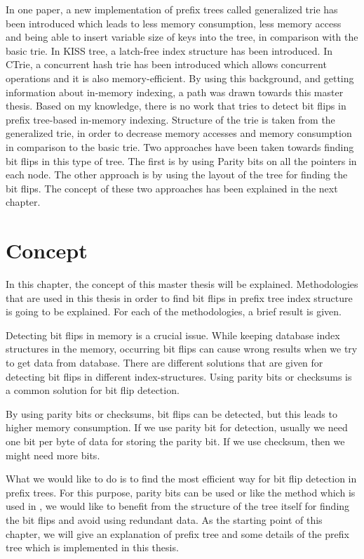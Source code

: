 \documentclass{report}
\begin{document}
 In one paper, a new implementation of prefix trees called generalized trie has been introduced which leads to less memory consumption, less memory access and being able to insert variable size of keys into the tree, in comparison with the basic trie. In KISS tree, a latch-free index structure has been introduced. In CTrie, a concurrent hash trie has been introduced which allows concurrent operations and it is also memory-efficient. 
By using this background, and getting information about in-memory indexing, a path was drawn towards this master thesis. Based on my knowledge, there is no work that tries to detect bit flips in prefix tree-based in-memory indexing. Structure of the trie is taken from the generalized trie, in order to decrease memory accesses and memory consumption in comparison to the basic trie. Two approaches have been taken towards finding bit flips in this type of tree. The first is by using Parity bits on all the pointers in each node. The other approach is by using the layout of the tree for finding the bit flips. The concept of these two approaches has been explained in the next chapter.

\chapter{Concept}

In this chapter, the concept of this master thesis will be explained. Methodologies that are used in this thesis in order to find bit flips in prefix tree index structure is going to be explained. For each of the methodologies, a brief result is given.

Detecting bit flips in memory is a crucial issue. While keeping database index structures in the memory, occurring bit flips can cause wrong results when we try to get data from database. There are different solutions that are given for detecting bit flips in different index-structures. Using parity bits or checksums is a common solution for bit flip detection. 

By using parity bits or checksums, bit flips can be detected, but this leads to higher memory consumption. If we use parity bit for detection, usually we need one bit per byte of data for storing the parity bit. If we use checksum, then we might need more bits.

What we would like to do is to find the most efficient way for bit flip detection in prefix trees. For this purpose, parity bits can be used or like the method which is used in \cite{kolditz}, we would like to benefit from the structure of the tree itself for finding the bit flips and avoid using redundant data. As the starting point of this chapter, we will give an explanation of prefix tree and some details of the prefix tree which is implemented in this thesis.   
\end{document}
